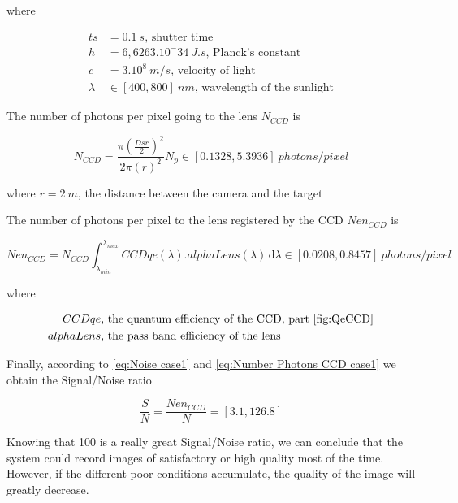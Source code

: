 where

\begin{align*}
ts & = 0.1\ s \mbox{, shutter time}  \\
h & = 6,6263.10^-34 \ J.s \mbox{, Planck's constant}  \\
c & = 3.10^8 \ m/s \mbox{, velocity of light} \\
\lambda & \in [400, 800] \ nm \mbox{, wavelength of the sunlight}
\end{align*}

The number of photons per pixel going to the lens $N_{CCD}$ is

\begin{equation}
\label{eq:Number Photons case1}
N_{CCD}=\frac{\pi\left(\frac{Dsr}{2}\right)^2}{2\pi(r)^2}N_p \in [0.1328, 5.3936] \ photons/pixel
\end{equation}

where $r = 2\ m$, the distance between the camera and the target

The number of photons per pixel to the lens registered by the CCD $Nen_{CCD}$ is

\begin{equation}
\label{eq:Number Photons CCD case1}
Nen_{CCD}= N_{CCD}\int_{\lambda_{min}}^{\lambda_{max}}CCDqe(\lambda).alphaLens(\lambda) \, \mathrm d\lambda \in [0.0208, 0.8457] \ photons/pixel
\end{equation}

where

\begin{align*}
CCDqe & \mbox{, the quantum efficiency of the CCD, part \ref{fig:QeCCD}}\\
alphaLens & \mbox{, the pass band efficiency of the lens}
\end{align*}

Finally, according to \eqref{eq:Noise case1} and \eqref{eq:Number Photons CCD case1} we obtain the Signal/Noise ratio 

\begin{equation}
\label{eq:Signal Noise Ratio case1}
\frac{S}{N} = \frac{Nen_{CCD}}{N} = [3.1, 126.8]
\end{equation}

Knowing that 100 is a really great Signal/Noise ratio, we can conclude that the system could record images of satisfactory or high quality most of the time. However, if the different poor conditions accumulate, the quality of the image will greatly decrease.

